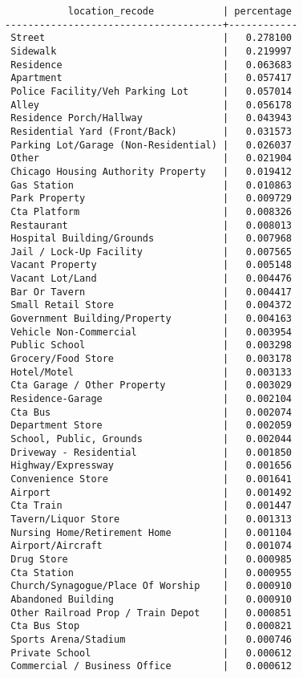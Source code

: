 \documentclass[10pt]{article}
\begin{document}
\begin{verbatim}
           location_recode            | percentage
--------------------------------------+------------
 Street                               |   0.278100
 Sidewalk                             |   0.219997
 Residence                            |   0.063683
 Apartment                            |   0.057417
 Police Facility/Veh Parking Lot      |   0.057014
 Alley                                |   0.056178
 Residence Porch/Hallway              |   0.043943
 Residential Yard (Front/Back)        |   0.031573
 Parking Lot/Garage (Non-Residential) |   0.026037
 Other                                |   0.021904
 Chicago Housing Authority Property   |   0.019412
 Gas Station                          |   0.010863
 Park Property                        |   0.009729
 Cta Platform                         |   0.008326
 Restaurant                           |   0.008013
 Hospital Building/Grounds            |   0.007968
 Jail / Lock-Up Facility              |   0.007565
 Vacant Property                      |   0.005148
 Vacant Lot/Land                      |   0.004476
 Bar Or Tavern                        |   0.004417
 Small Retail Store                   |   0.004372
 Government Building/Property         |   0.004163
 Vehicle Non-Commercial               |   0.003954
 Public School                        |   0.003298
 Grocery/Food Store                   |   0.003178
 Hotel/Motel                          |   0.003133
 Cta Garage / Other Property          |   0.003029
 Residence-Garage                     |   0.002104
 Cta Bus                              |   0.002074
 Department Store                     |   0.002059
 School, Public, Grounds              |   0.002044
 Driveway - Residential               |   0.001850
 Highway/Expressway                   |   0.001656
 Convenience Store                    |   0.001641
 Airport                              |   0.001492
 Cta Train                            |   0.001447
 Tavern/Liquor Store                  |   0.001313
 Nursing Home/Retirement Home         |   0.001104
 Airport/Aircraft                     |   0.001074
 Drug Store                           |   0.000985
 Cta Station                          |   0.000955
 Church/Synagogue/Place Of Worship    |   0.000910
 Abandoned Building                   |   0.000910
 Other Railroad Prop / Train Depot    |   0.000851
 Cta Bus Stop                         |   0.000821
 Sports Arena/Stadium                 |   0.000746
 Private School                       |   0.000612
 Commercial / Business Office         |   0.000612

\end{verbatim}
\end{document}

